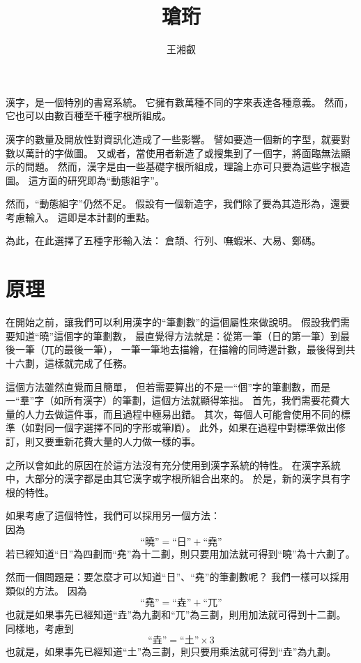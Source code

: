 \documentclass{article}
\title{瑲珩}
\author{王湘叡}
\newcommand\qhchar[1]{\mbox{#1}}
\begin{document}
\maketitle{}

漢字，是一個特別的書寫系統。%
它擁有數萬種不同的字來表達各種意義。%
然而，它也可以由數百種至千種字根所組成。

漢字的數量及開放性對資訊化造成了一些影響。
譬如要造一個新的字型，就要對數以萬計的字做圖。
又或者，當使用者新造了或搜集到了一個字，將面臨無法顯示的問題。
然而，漢字是由一些基礎字根所組成，理論上亦可只要為這些字根造圖。
這方面的研究即為``動態組字''。

然而，``動態組字''仍然不足。
假設有一個新造字，我們除了要為其造形為，還要考慮輸入。
這即是本計劃的重點。

為此，在此選擇了五種字形輸入法：
倉頡、行列、嘸蝦米、大易、鄭碼。

\section{原理}
在開始之前，讓我們可以利用漢字的``筆劃數''的這個屬性來做說明。%
假設我們需要知道``曉''這個字的筆劃數，%
最直覺得方法就是：從第一筆（日的第一筆）到最後一筆（兀的最後一筆），%
一筆一筆地去描繪，在描繪的同時邊計數，最後得到共十六劃，這樣就完成了任務。%

這個方法雖然直覺而且簡單，%
但若需要算出的不是一``個''字的筆劃數，而是一``羣''字（如所有漢字）的筆劃，這個方法就顯得笨拙。
首先，我們需要花費大量的人力去做這件事，而且過程中極易出錯。
其次，每個人可能會使用不同的標準（如對同一個字選擇不同的字形或筆順）。
此外，如果在過程中對標準做出修訂，則又要重新花費大量的人力做一樣的事。

之所以會如此的原因在於這方法沒有充分使用到漢字系統的特性。
在漢字系統中，大部分的漢字都是由其它漢字或字根所組合出來的。
於是，新的漢字具有字根的特性。

如果考慮了這個特性，我們可以採用另一個方法：\\
因為\\
\[
  \qhchar{``曉''}=\qhchar{``日''}+\qhchar{``堯''}
\]
若已經知道``日''為四劃而``堯''為十二劃，則只要用加法就可得到``曉''為十六劃了。%

然而一個問題是：要怎麼才可以知道``日''、``堯''的筆劃數呢？%
我們一樣可以採用類似的方法。
因為\\
\[
  \qhchar{``堯''}=\qhchar{``垚''}+\qhchar{``兀''}
\]
也就是如果事先已經知道``垚''為九劃和``兀''為三劃，則用加法就可得到十二劃。
同樣地，考慮到\\
\[
  \qhchar{``垚''}=\qhchar{``土''}\times 3
\]
也就是，如果事先已經知道``土''為三劃，則只要用乘法就可得到``垚''為九劃。
\end{document}
